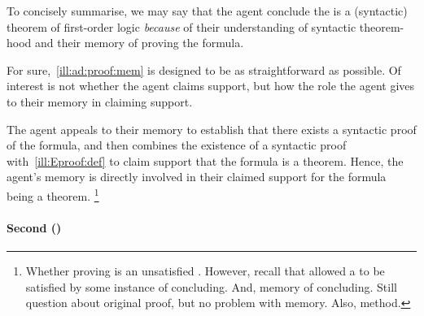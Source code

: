 \begin{note}
  To concisely summarise, we may say that the agent conclude the is a (syntactic) theorem of first-order logic \emph{because} of their understanding of syntactic theorem-hood and their memory of proving the formula.

  For sure,~\autoref{ill:ad:proof:mem} is designed to be as straightforward as possible.
  Of interest is not whether the agent claims support, but how the role the agent gives to their memory in claiming support.

  The agent appeals to their memory to establish that there exists a syntactic proof of the formula, and then combines the existence of a syntactic proof with~\ref{ill:Eproof:def} to claim support that the formula is a theorem.
  Hence, the agent's memory is directly involved in their claimed support for the formula being a theorem.\nolinebreak
    \footnote{
      \color{red}
      Whether proving is an unsatisfied \requ{}.
      However, recall that allowed a \requ{} to be satisfied by some instance of concluding.
      And, memory of concluding.
      Still question about original proof, but no problem with memory.
      Also, method.
    }
\end{note}

\paragraph{Second  (\adB{})}

